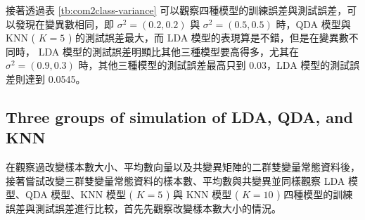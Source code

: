 \begin{itemize}
\renewcommand\arraystretch{1.5}
\begin{table}[h]
\scriptsize
\setlength{\belowcaptionskip}{0pt}
\centering
\caption{Error Rate of three Methods of changing variance for two classes}\label{tb:com2class-variance}
\end{table}

接著透過表 \ref{tb:com2class-variance} 可以觀察四種模型的訓練誤差與測試誤差，可以發現在變異數相同，即 $\sigma^2=(0.2,0.2)$ 與 $\sigma^2=(0.5,0.5)$ 時，QDA 模型與 KNN ( $K=5$ ) 的測試誤差最大，而 LDA 模型的表現算是不錯，但是在變異數不同時， LDA 模型的測試誤差明顯比其他三種模型要高得多，尤其在 $\sigma^2=(0.9,0.3)$ 時，其他三種模型的測試誤差最高只到 0.03，LDA 模型的測試誤差則達到 0.0545。

\end{itemize}

\subsection{Three groups of simulation of LDA, QDA, and KNN} 

在觀察過改變樣本數大小、平均數向量以及共變異矩陣的二群雙變量常態資料後，接著嘗試改變三群雙變量常態資料的樣本數、平均數與共變異並同樣觀察 LDA 模型、QDA 模型、KNN 模型 ( $K=5$ ) 與 KNN 模型 ( $K=10$ ) 四種模型的訓練誤差與測試誤差進行比較，首先先觀察改變樣本數大小的情況。

